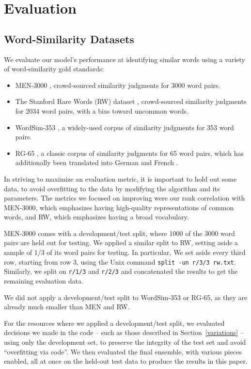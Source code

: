 \documentclass[11pt,letterpaper]{article}
\begin{document}
\section{Evaluation}

\subsection{Word-Similarity Datasets}

We evaluate our model's performance at identifying similar words using a
variety of word-similarity gold standards:

\begin{itemize}
\item MEN-3000 \cite{bruni2014men}, crowd-sourced similarity judgments for 3000
    word pairs.
\item The Stanford Rare Words (RW) dataset \cite{luong2013rw}, crowd-sourced
    similarity judgments for 2034 word pairs, with a bias toward uncommon words.
\item WordSim-353 \cite{finkelstein2001ws}, a widely-used corpus of similarity
    judgments for 353 word pairs.
\item RG-65 \cite{rubenstein1965rg}, a classic corpus of similarity judgments
    for 65 word pairs, which has additionally been translated into German
    \cite{gurevych2005german} and French \cite{joubarne2011french}.
\end{itemize}

In striving to maximize an evaluation metric, it is important to hold out some
data, to avoid overfitting to the data by modifying the algorithm and its
parameters. The metrics we focused on improving were our rank correlation with
MEN-3000, which emphasizes having high-quality representations of common words,
and RW, which emphasizes having a broad vocabulary.

MEN-3000 comes with a development/test split, where 1000 of the 3000 word pairs
are held out for testing. We applied a similar split to RW, setting aside a
sample of $1/3$ of its word pairs for testing. In particular, We set aside
every third row, starting from row 3, using the Unix command {\tt split -un
r/3/3 rw.txt}. Similarly, we split on {\tt r/1/3} and {\tt r/2/3} and
concatenated the results to get the remaining evaluation data.

We did not apply a development/test split to WordSim-353 or RG-65, as they are
already much smaller than MEN and RW.

For the resources where we applied a development/test split, we evaluated
decisions we made in the code -- such as those described in
Section~\ref{variations} -- using only the development set, to preserve the
integrity of the test set and avoid ``overfitting via code''. We then evaluated
the final ensemble, with various pieces enabled, all at once on the held-out
test data to produce the results in this paper.
\end{document}
